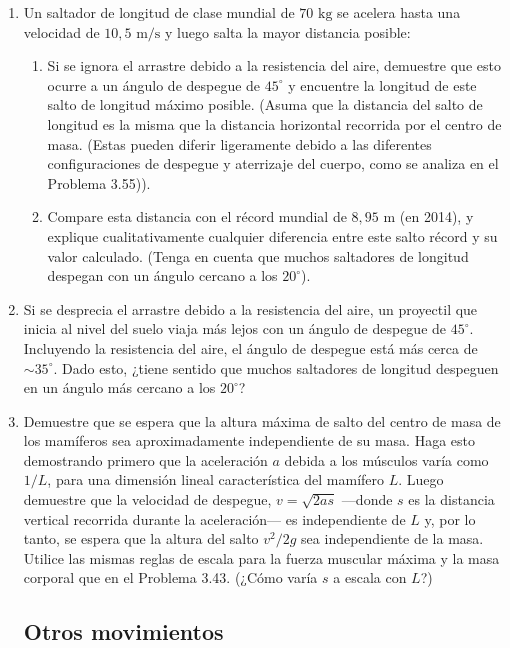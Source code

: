\documentclass[12pt]{book}
\begin{document}
\begin{enumerate}
\item[3.56] Un saltador de longitud de clase mundial de $70\text{ kg}$ se acelera hasta una velocidad de $10{,}5\text{ m/s}$ y luego salta la mayor distancia posible:
\begin{enumerate}
\item[(a)] Si se ignora el arrastre debido a la resistencia del aire, demuestre que esto ocurre a un ángulo de despegue de $45^\circ$ y encuentre la longitud de este salto de longitud máximo posible. (Asuma que la distancia del salto de longitud es la misma que la distancia horizontal recorrida por el centro de masa. (Estas pueden diferir ligeramente debido a las diferentes configuraciones de despegue y aterrizaje del cuerpo, como se analiza en el Problema 3.55)).
\item[(b)] Compare esta distancia con el récord mundial de $8{,}95\text{ m}$ (en 2014), y explique cualitativamente cualquier diferencia entre este salto récord y su valor calculado. (Tenga en cuenta que muchos saltadores de longitud despegan con un ángulo cercano a los $20^\circ$).
\end{enumerate}

\item[3.57] Si se desprecia el arrastre debido a la resistencia del aire, un proyectil que inicia al nivel del suelo viaja más lejos con un ángulo de despegue de $45^\circ$. Incluyendo la resistencia del aire, el ángulo de despegue está más cerca de $\sim 35^\circ$. Dado esto, ¿tiene sentido que muchos saltadores de longitud despeguen en un ángulo más cercano a los $20^\circ$?

\item[3.58] Demuestre que se espera que la altura máxima de salto del centro de masa de los mamíferos sea aproximadamente independiente de su masa. Haga esto demostrando primero que la aceleración $a$ debida a los músculos varía como $1/L$, para una dimensión lineal característica del mamífero $L$. Luego demuestre que la velocidad de despegue, $v = \sqrt{2as}$ ---donde $s$ es la distancia vertical recorrida durante la aceleración--- es independiente de $L$ y, por lo tanto, se espera que la altura del salto $v^2/2g$ sea independiente de la masa. Utilice las mismas reglas de escala para la fuerza muscular máxima y la masa corporal que en el Problema 3.43. (¿Cómo varía $s$ a escala con $L$?)

\subsection*{Otros movimientos}


\end{enumerate}
\end{document}
